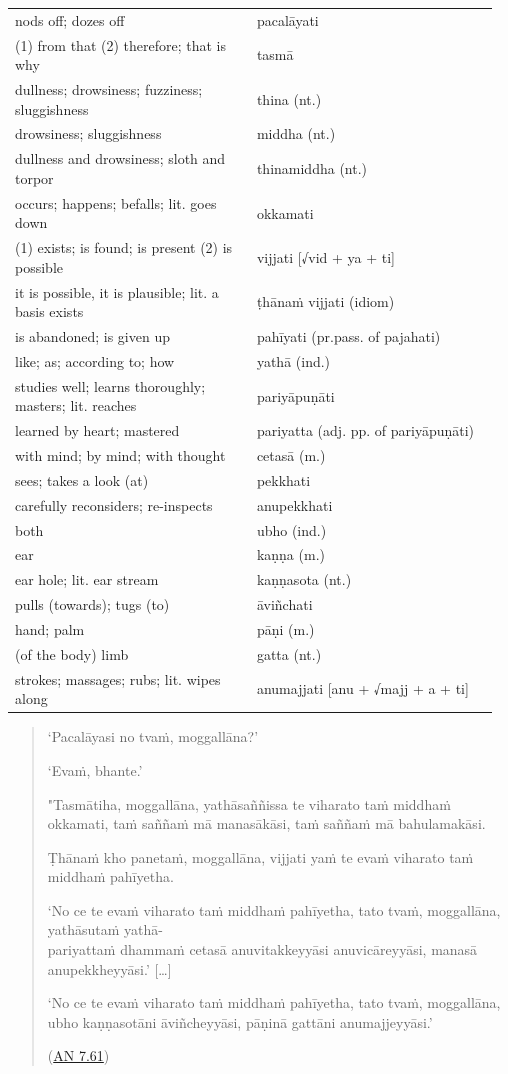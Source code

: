 \documentclass[11pt,oneside]{memoir}
\begin{document}
\begin{longtable}{L{0.48\linewidth} L{0.48\linewidth}}
nods off; dozes off & pacalāyati\\
(1) from that (2) therefore; that is why & tasmā\\
dullness; drowsiness; fuzziness; sluggishness & thina (nt.)\\
drowsiness; sluggishness & middha (nt.)\\
dullness and drowsiness; sloth and torpor & thinamiddha (nt.)\\
occurs; happens; befalls; lit. goes down & okkamati\\
(1) exists; is found; is present (2) is possible & vijjati [√vid + ya + ti]\\
it is possible, it is plausible; lit. a basis exists & ṭhānaṁ vijjati (idiom)\\
is abandoned; is given up & pahīyati (pr.pass. of pajahati)\\
like; as; according to; how & yathā (ind.)\\
studies well; learns thoroughly; masters; lit. reaches & pariyāpuṇāti\\
learned by heart; mastered & pariyatta (adj. pp. of pariyāpuṇāti)\\
with mind; by mind; with thought & cetasā (m.)\\
sees; takes a look (at) & pekkhati\\
carefully reconsiders; re-inspects & anupekkhati\\
both & ubho (ind.)\\
ear & kaṇṇa (m.)\\
ear hole; lit. ear stream & kaṇṇasota (nt.)\\
pulls (towards); tugs (to) & āviñchati\\
hand; palm & pāṇi (m.)\\
(of the body) limb & gatta (nt.)\\
strokes; massages; rubs; lit. wipes along & anumajjati [anu + √majj + a + ti]\\
\end{longtable}

\bigskip

\begin{quote}
`Pacalāyasi no tvaṁ, moggallāna?'

`Evaṁ, bhante.'

"Tasmātiha, moggallāna, yathāsaññissa te viharato taṁ middhaṁ okkamati, taṁ
saññaṁ mā manasākāsi, taṁ saññaṁ mā bahulamakāsi.

Ṭhānaṁ kho panetaṁ, moggallāna, vijjati yaṁ te evaṁ viharato taṁ middhaṁ pahīyetha.

`No ce te evaṁ viharato taṁ middhaṁ pahīyetha, tato tvaṁ, moggallāna, yathāsutaṁ yathā-\\
pariyattaṁ dhammaṁ cetasā anuvitakkeyyāsi anuvicāreyyāsi, manasā anupekkheyyāsi.' [\ldots{}]

`No ce te evaṁ viharato taṁ middhaṁ pahīyetha, tato tvaṁ, moggallāna, ubho
kaṇṇasotāni āviñcheyyāsi, pāṇinā gattāni anumajjeyyāsi.'

(\href{https://suttacentral.net/an7.61/en/sujato}{AN 7.61})
\end{quote}
\end{document}

